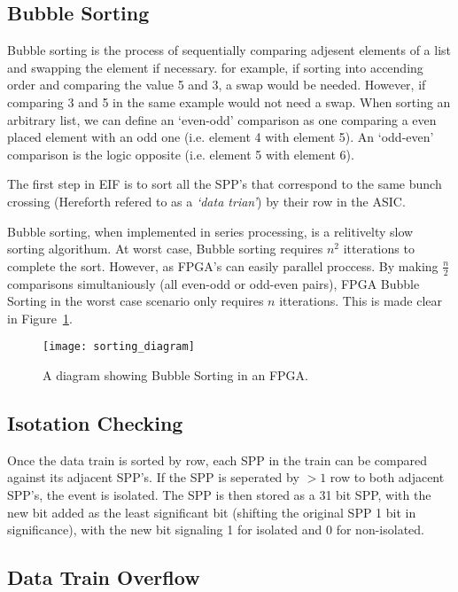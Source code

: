 		\subsection{Bubble Sorting}

		Bubble sorting is the process of sequentially comparing adjesent elements of a list and swapping the element if necessary.
		for example, if sorting into accending order and comparing the value 5 and 3, a swap would be needed.
		However, if comparing 3 and 5 in the same example would not need a swap.
		When sorting an arbitrary list, we can define an `even-odd' comparison as one comparing a even placed element with an odd one (i.e. element 4 with element 5).
		An `odd-even' comparison is the logic opposite (i.e. element 5 with element 6).

		The first step in EIF is to sort all the SPP's that correspond to the same bunch crossing (Hereforth refered to as a \textit{`data trian'}) by their row in the ASIC.
		\par
		Bubble sorting, when implemented in series processing, is a relitivelty slow sorting algorithum.
		At worst case, Bubble sorting requires $n^2$ itterations to complete the sort.
		However, as FPGA's can easily parallel proccess.
		By making $\frac{n}{2}$ comparisons simultaniously (all even-odd or odd-even pairs), FPGA Bubble Sorting in the worst case scenario only requires $n$ itterations. This is made clear in Figure~\ref{fig:sorting}.

		\begin{figure}[ht]
			\centering
			\texttt{[image: sorting\_diagram]}
			\caption{A diagram showing Bubble Sorting in an FPGA.}
			\label{fig:sorting}
		\end{figure}

	\subsection{Isotation Checking}

		Once the data train is sorted by row, each SPP in the train can be compared against its adjacent SPP's.
		If the SPP is seperated by $>1$ row to both adjacent SPP's, the event is isolated.
		The SPP is then stored as a 31 bit SPP, with the new bit added as the least significant bit (shifting the original SPP 1 bit in significance), with the new bit signaling 1 for isolated and 0 for non-isolated. 

	\subsection{Data Train Overflow} %
	\label{sub:data_train_overflow}
		
